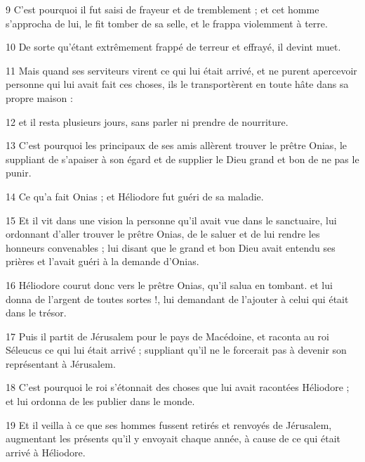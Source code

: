 \par 9 C'est pourquoi il fut saisi de frayeur et de tremblement ; et cet homme s'approcha de lui, le fit tomber de sa selle, et le frappa violemment à terre.

\par 10 De sorte qu'étant extrêmement frappé de terreur et effrayé, il devint muet.

\par 11 Mais quand ses serviteurs virent ce qui lui était arrivé, et ne purent apercevoir personne qui lui avait fait ces choses, ils le transportèrent en toute hâte dans sa propre maison :

\par 12 et il resta plusieurs jours, sans parler ni prendre de nourriture.

\par 13 C'est pourquoi les principaux de ses amis allèrent trouver le prêtre Onias, le suppliant de s'apaiser à son égard et de supplier le Dieu grand et bon de ne pas le punir.

\par 14 Ce qu'a fait Onias ; et Héliodore fut guéri de sa maladie.

\par 15 Et il vit dans une vision la personne qu'il avait vue dans le sanctuaire, lui ordonnant d'aller trouver le prêtre Onias, de le saluer et de lui rendre les honneurs convenables ; lui disant que le grand et bon Dieu avait entendu ses prières et l'avait guéri à la demande d'Onias.

\par 16 Héliodore courut donc vers le prêtre Onias, qu'il salua en tombant. et lui donna de l'argent de toutes sortes !, lui demandant de l'ajouter à celui qui était dans le trésor.

\par 17 Puis il partit de Jérusalem pour le pays de Macédoine, et raconta au roi Séleucus ce qui lui était arrivé ; suppliant qu'il ne le forcerait pas à devenir son représentant à Jérusalem.

\par 18 C'est pourquoi le roi s'étonnait des choses que lui avait racontées Héliodore ; et lui ordonna de les publier dans le monde.

\par 19 Et il veilla à ce que ses hommes fussent retirés et renvoyés de Jérusalem, augmentant les présents qu'il y envoyait chaque année, à cause de ce qui était arrivé à Héliodore.

